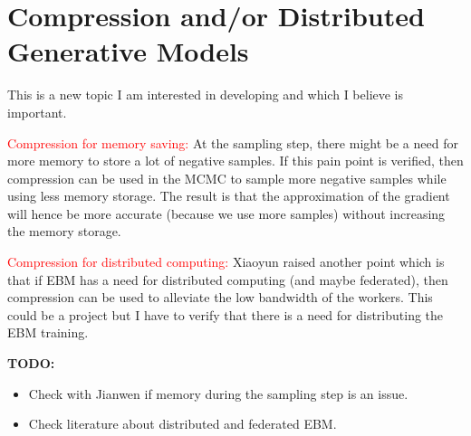 \documentclass{article}
\begin{document}
\section{Compression and/or Distributed Generative Models}

This is a new topic I am interested in developing and which I believe is important.

\textcolor{red}{Compression for memory saving:} At the sampling step, there might be a need for more memory to store a lot of negative samples.
If this pain point is verified, then compression can be used in the MCMC to sample more negative samples while using less memory storage. 
The result is that the approximation of the gradient will hence be more accurate (because we use more samples) without increasing the memory storage.


\textcolor{red}{Compression for distributed computing:} 
Xiaoyun raised another point which is that if EBM has a need for distributed computing (and maybe federated), then compression can be used to alleviate the low bandwidth of the workers.
This could be a project but I have to verify that there is a need for distributing the EBM training.


\textbf{TODO:}
\begin{itemize}
\item Check with Jianwen if memory during the sampling step is an issue. 
\item Check literature about distributed and federated EBM.
\end{itemize}





\end{document}
